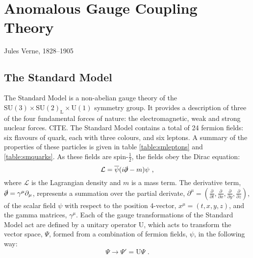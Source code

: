 \chapter{Anomalous Gauge Coupling Theory}
\label{chap:anomalousgaugecouplingtheory}

{Jules Verne, 1828--1905}
%
%
\section{The Standard Model}
The Standard Model is a non-abelian gauge theory of the $\text{SU}(3) \times \text{SU}(2)_{\text{L}} \times \text{U}(1)$ symmetry group.  It provides a description of three of the four fundamental forces of nature: the electromagnetic, weak and strong nuclear forces.  CITE.  The Standard Model contains a total of 24 fermion fields: six flavours of quark, each with three colours, and six leptons.  A summary of the properties of these particles is given in table \ref{table:smleptons} and \ref{table:smquarks}.  As these fields are spin-$\frac{1}{2}$, the fields obey the Dirac equation:
%
\begin{equation}
\mathcal{L} = \overline{\psi}(i \slashed{\partial} - m)\psi \text{ ,}
\end{equation}
%
\noindent where $\mathcal{L}$ is the Lagrangian density and $m$ is a mass term.  The derivative term, $\slashed{\partial} = \gamma^{\mu}\partial_{\mu}$, represents a summation over the partial derivate, $\partial^{\mu} = (\frac{\partial}{\partial{t}},\frac{\partial}{\partial{x}},\frac{\partial}{\partial{y}},\frac{\partial}{\partial{z}})$, of the scalar field $\psi$ with respect to the position 4-vector, $x^{\mu} = (t,x,y,z)$, and the gamma matrices, $\gamma^{\mu}$.  Each of the gauge transformations of the Standard Model act are defined by a unitary operator \textrm{U}, which acts to transform the vector space, $\Psi$, formed from a combination of fermion fields, $\psi$, in the following way:
%
\begin{equation}
\Psi \rightarrow \Psi' = \textrm{U}\Psi \text{ .}
\end{equation}
%
